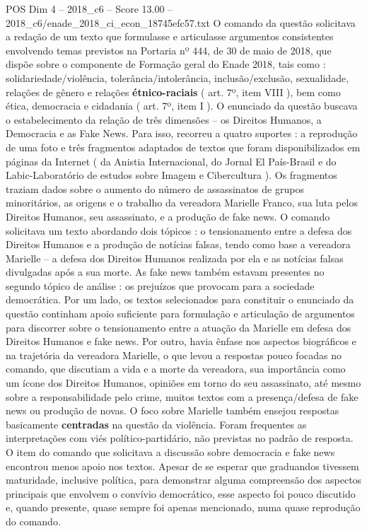 \begin{textsample}{POS Dim 4 – 2018\_c6 – Score 13.00 – 2018\_c6/enade\_2018\_ci\_econ\_18745efc57.txt}
O comando da questão solicitava a redação de um texto que formulasse e articulasse argumentos consistentes envolvendo temas previstos na Portaria nº 444, de 30 de maio de 2018, que dispõe sobre o componente de Formação geral do Enade 2018, tais como : solidariedade/violência, tolerância/intolerância, inclusão/exclusão, sexualidade, relações de gênero e relações \textbf{étnico-raciais} ( art. 7º, item VIII ), bem como ética, democracia e cidadania ( art. 7º, item I ).
O enunciado da questão buscava o estabelecimento da relação de três dimensões – os Direitos Humanos, a Democracia e as Fake News.
Para isso, recorreu a quatro suportes : a reprodução de uma foto e três fragmentos adaptados de textos que foram disponibilizados em páginas da Internet ( da Anistia Internacional, do Jornal El País-Brasil e do Labic-Laboratório de estudos sobre Imagem e Cibercultura ).
Os fragmentos traziam dados sobre o aumento do número de assassinatos de grupos minoritários, as origens e o trabalho da vereadora Marielle Franco, sua luta pelos Direitos Humanos, seu assassinato, e a produção de fake news.
O comando solicitava um texto abordando dois tópicos : o tensionamento entre a defesa dos Direitos Humanos e a produção de notícias falsas, tendo como base a vereadora Marielle – a defesa dos Direitos Humanos realizada por ela e as notícias falsas divulgadas após a sua morte.
As fake news também estavam presentes no segundo tópico de análise : os prejuízos que provocam para a sociedade democrática.
Por um lado, os textos selecionados para constituir o enunciado da questão continham apoio suficiente para formulação e articulação de argumentos para discorrer sobre o tensionamento entre a atuação da Marielle em defesa dos Direitos Humanos e fake news.
Por outro, havia ênfase nos aspectos biográficos e na trajetória da vereadora Marielle, o que levou a respostas pouco focadas no comando, que discutiam a vida e a morte da vereadora, sua importância como um ícone dos Direitos Humanos, opiniões em torno do seu assassinato, até mesmo sobre a responsabilidade pelo crime, muitos textos com a presença/defesa de fake news ou produção de novas.
O foco sobre Marielle também ensejou respostas basicamente \textbf{centradas} na questão da violência.
Foram frequentes as interpretações com viés político-partidário, não previstas no padrão de resposta.
O item do comando que solicitava a discussão sobre democracia e fake news encontrou menos apoio nos textos.
Apesar de se esperar que graduandos tivessem maturidade, inclusive política, para demonstrar alguma compreensão dos aspectos principais que envolvem o convívio democrático, esse aspecto foi pouco discutido e, quando presente, quase sempre foi apenas mencionado, numa quase reprodução do comando.

\end{textsample}

